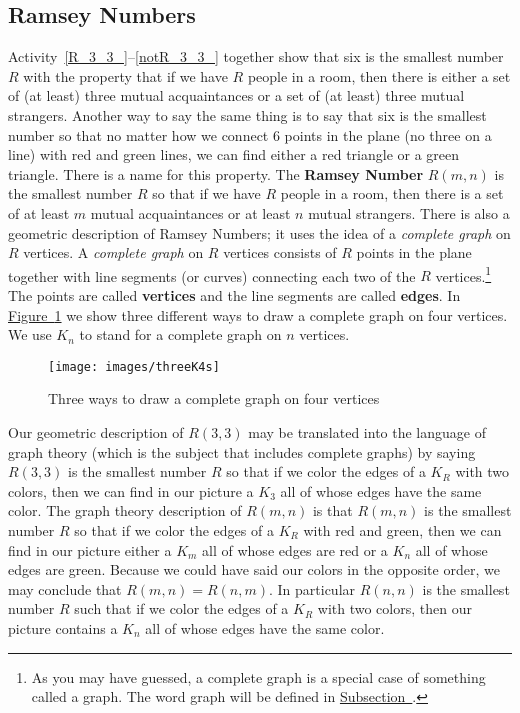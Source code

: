 \documentclass[10pt,]{book}
\newcommand{\terminology}[1]{\textbf{#1}}
\theoremstyle{plain}
\theoremstyle{definition}
\numberwithin{equation}{chapter}
\begin{document}
\subsection[{Ramsey Numbers}]{Ramsey Numbers}\label{Ramseysection}
Activity~\hyperref[R_3_3_]{\ref{R_3_3_}}--\hyperref[notR_3_3_]{\ref{notR_3_3_}} together show that six is the smallest number \(R\) with the property that if we have \(R\) people in a room, then there is either a set of (at least) three mutual acquaintances or a set of (at least) three mutual strangers. Another way to say the same thing is to say that six is the smallest number so that no matter how we connect 6 points in the plane (no three on a line) with red and green lines, we can find either a red triangle or a green triangle. There is a name for this property. The \terminology{Ramsey Number} \(R(m,n)\) is the smallest number \(R\) so that if we have \(R\) people in a room, then there is a set of at least \(m\) mutual acquaintances or at least \(n\) mutual strangers. There is also a geometric description of Ramsey Numbers; it uses the idea of a \emph{complete graph} on \(R\) vertices. A \emph{complete graph} on \(R\) vertices consists of \(R\) points in the plane together with line segments (or curves) connecting each two of the \(R\) vertices.\footnote{As you may have guessed, a complete graph is a special case of something called a graph.  The word graph will be defined in \hyperref[graphsection]{Subsection~}.\label{fn-4}} The points are called \terminology{vertices} and the line segments are called \terminology{edges}. In \hyperref[completegraph]{Figure~\ref{completegraph}} we show three different ways to draw a complete graph on four vertices. We use \(K_n\) to stand for a complete graph on \(n\) vertices.%
\begin{figure}
\centering
\texttt{[image: images/threeK4s]}
\caption{Three ways to draw a complete graph on four vertices\label{completegraph}}
\end{figure}
Our geometric description of \(R(3,3)\) may be translated into the language of graph theory (which is the subject that includes complete graphs) by saying \(R(3,3)\) is the smallest number \(R\) so that if we color the edges of a \(K_R\) with two colors, then we can find in our picture a \(K_3\) all of whose edges have the same color.  The graph theory description of \(R(m,n)\) is that \(R(m,n)\) is the smallest number \(R\) so that if we color the edges of a \(K_R\) with red and green, then we can find in our picture either a \(K_m\) all of whose edges are red or a \(K_n\) all of whose edges are green. Because we could have said our colors in the opposite order, we may conclude that \(R(m,n) = R(n,m)\). In particular \(R(n,n)\) is the smallest number \(R\) such that if we color the edges of a \(K_R\) with two colors, then our picture contains a \(K_n\) all of whose edges have the same color.%
\end{document}
